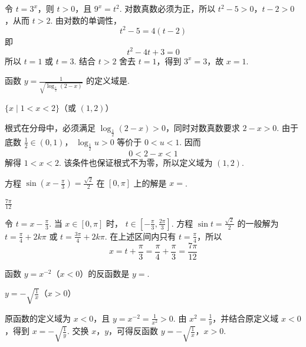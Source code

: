 \documentclass[UTF8,a4paper,oneside,11pt]{ctexbook}
\begin{document}
\begin{solution}
令 \(t=3^x\)，则 \(t>0\)，且 \(9^x=t^2\). 对数真数必须为正，所以
\(t^2-5>0\)，\(t-2>0\)，从而 \(t>2\). 由对数的单调性，
\[
t^2-5=4(t-2)
\]
即
\[
t^2-4t+3=0
\]
所以 \(t=1\) 或 \(t=3\). 结合 \(t>2\) 舍去 \(t=1\)，得到 \(3^x=3\)，故 \(x=1\).
\end{solution}

\begin{problem}
函数 \(y=\frac{1}{\sqrt{\log_{\frac{1}{2}}(2-x)}}\) 的定义域是\fillinblank{}.
\end{problem}

\begin{answer}
\(\{x \mid 1 < x < 2\}\)（或 \((1,2)\)）
\end{answer}

\begin{solution}
根式在分母中，必须满足
\(\log_{\frac{1}{2}}(2-x)>0\)，同时对数真数要求 \(2-x>0\). 由于底数 \(\frac{1}{2}\in(0,1)\)，
\(\log_{\frac{1}{2}}u>0\) 等价于 \(0<u<1\). 因而
\[
0<2-x<1
\]
解得 \(1<x<2\). 该条件也保证根式不为零，所以定义域为 \((1,2)\).
\end{solution}

\begin{problem}
方程 \(\sin\left(x-\frac{\pi}{3}\right)=\frac{\sqrt{2}}{2}\) 在 \([0,\pi]\) 上的解是 \(x=\)\fillinblank{}.
\end{problem}

\begin{answer}
\(\frac{7\pi}{12}\)
\end{answer}

\begin{solution}
令 \(t=x-\frac{\pi}{3}\). 当 \(x\in[0,\pi]\) 时，
\(t\in\left[-\frac{\pi}{3},\frac{2\pi}{3}\right]\). 方程
\(\sin t=\frac{\sqrt{2}}{2}\) 的一般解为
\(t=\frac{\pi}{4}+2k\pi\) 或 \(t=\frac{3\pi}{4}+2k\pi\). 在上述区间内只有
\(t=\frac{\pi}{4}\)，所以
\[
x=t+\frac{\pi}{3}=\frac{\pi}{4}+\frac{\pi}{3}=\frac{7\pi}{12}
\]
\end{solution}

\begin{problem}
函数 \(y=x^{-2}\)（\(x<0\)）的反函数是 \(y=\)\fillinblank{}.
\end{problem}

\begin{answer}
\(y=-\sqrt{\frac{1}{x}}\)（\(x>0\)）
\end{answer}

\begin{solution}
原函数的定义域为 \(x<0\)，且 \(y=x^{-2}=\frac{1}{x^2}>0\). 由
\(x^2=\frac{1}{y}\)，并结合原定义域 \(x<0\)，得到
\(x=-\sqrt{\frac{1}{y}}\). 交换 \(x\)，\(y\)，可得反函数
\(y=-\sqrt{\frac{1}{x}}\)，\(x>0\).
\end{solution}
\end{document}

